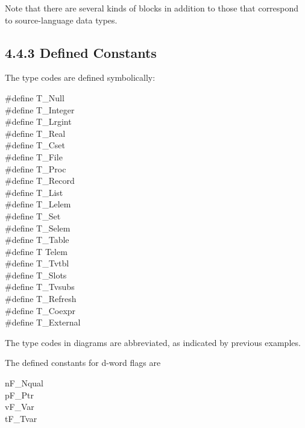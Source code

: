 Note that there are several kinds of blocks in addition to those that
correspond to source-language data types.

\subsection[4.4.3 Defined Constants]{4.4.3 Defined Constants}

The type codes are defined symbolically:

\begin{iconcode}
\#define\>\>\> T\_Null		\>\>\>\>\\	
\#define\>\>\> T\_Integer	\>\>\>\>\\	
\#define\>\>\> T\_Lrgint	\>\>\>\>\\	
\#define\>\>\> T\_Real		\>\>\>\>\\	
\#define\>\>\> T\_Cset		\>\>\>\>\\	
\#define\>\>\> T\_File		\>\>\>\>\\	
\#define\>\>\> T\_Proc		\>\>\>\>\\	
\#define\>\>\> T\_Record	\>\>\>\>\\	
\#define\>\>\> T\_List		\>\>\>\>\\	
\#define\>\>\> T\_Lelem		\>\>\>\>\\	
\#define\>\>\> T\_Set		\>\>\>\>\>10\\
\#define\>\>\> T\_Selem		\>\>\>\>\\
\#define\>\>\> T\_Table		\>\>\>\>\\
\#define\>\>\> T Telem		\>\>\>\>\>13\\
\#define\>\>\> T\_Tvtbl		\>\>\>\>\\
\#define\>\>\> T\_Slots		\>\>\>\>\\
\#define\>\>\> T\_Tvsubs	\>\>\>\>\\
\#define\>\>\> T\_Refresh	\>\>\>\>\\
\#define\>\>\> T\_Coexpr	\>\>\>\>\\
\#define\>\>\> T\_External	\>\>\>\>
\end{iconcode}

The type codes in diagrams are abbreviated, as indicated by previous examples.


The defined constants for d-word flags are

\begin{iconcode}
\>n\>\>F\_Nqual\\
\>p\>\>F\_Ptr\\
\>v\>\>F\_Var\\
\>t\>\>F\_Tvar
\end{iconcode}

